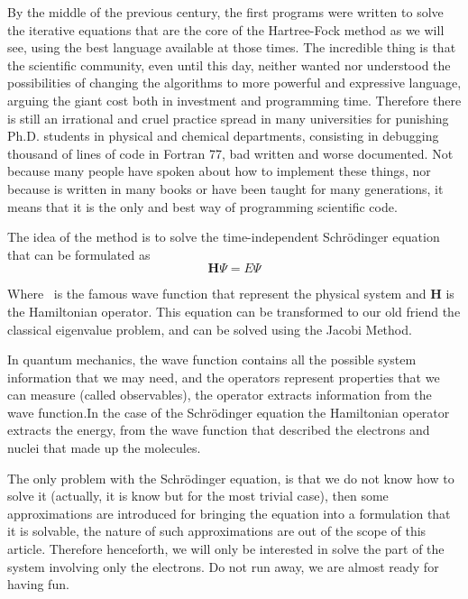 \documentclass{tmr}
\begin{document}
 
\par By the middle of the previous century, the first programs were written to solve the 
iterative equations that are the core of the Hartree-Fock method as we will see, using
the best language available at those times. The incredible thing is that the scientific community, even until
this day, neither wanted nor understood the possibilities of changing the algorithms to 
more powerful and expressive language, arguing the giant cost both in investment and programming time. Therefore 
there is still an irrational and cruel practice spread in many universities for punishing Ph.D. students
in physical and chemical departments, consisting in debugging thousand of lines of code in Fortran 77,
bad written and worse documented. Not because many people have spoken about how to implement
these things, nor because is written in many books or have been taught 
for many generations, it means that it is the only and best way of programming scientific code.

\par The idea of the method is to solve the time-independent Schr\"{o}dinger
 equation that can be formulated as
\[ \mathbf{H}\Psi = E\Psi \]

Where \textPsi\ is the famous wave function that represent the physical
system and \textbf{H} is the Hamiltonian operator. This equation can be
transformed to our old friend the classical eigenvalue problem, and can
be solved using the Jacobi Method.

\par In quantum mechanics, the wave function contains all the possible system information that 
we may need, and the operators represent properties that we can measure (called observables),
the operator extracts information from the wave function.In the case of the Schr\"odinger 
equation the Hamiltonian operator extracts the energy, from the wave function that described
the electrons and nuclei that made up the molecules.

\par The only problem with the Schr\"odinger equation, is that we do not know how to solve it 
(actually, it is know but for the most trivial case),
then some approximations are introduced for bringing the equation into 
a formulation that it is solvable, the nature of such approximations are out of the scope of this article.
Therefore henceforth, we will only be interested in solve the part of the system involving
only the electrons. Do not run away, we are almost ready for having fun.
\end{document}

